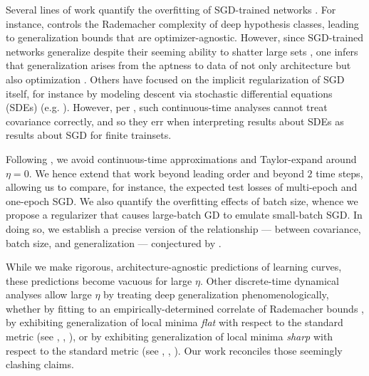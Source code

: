 \documentclass{article}
\theoremstyle{plain}
\theoremstyle{definition}
\begin{document}

    Several lines of work quantify the overfitting of SGD-trained networks
    \citep{ne17a}.  For instance, \citet{ba17} controls the Rademacher
    complexity of deep hypothesis classes, leading to generalization bounds
    that are optimizer-agnostic.  However, since SGD-trained networks
    generalize despite their seeming ability to shatter large sets
    \citep{zh17}, one infers that generalization arises from the aptness to
    data of not only architecture but also optimization \citep{ne17b}.  Others
    have focused on the implicit regularization of SGD itself, for instance by
    modeling descent via stochastic differential equations (SDEs) (e.g.
    \citet{ch18}).  However, per \citet{ya19a}, such continuous-time analyses
    cannot treat covariance correctly, and so they err when interpreting
    results about SDEs as results about SGD for finite trainsets.


    Following \citet{ro18}, we avoid continuous-time approximations and
    Taylor-expand around $\eta=0$.  We hence
    extend that work beyond leading order and beyond $2$ time steps,
    allowing us to compare, for instance, the expected test losses of
    multi-epoch and one-epoch SGD.  We also quantify the overfitting effects of
    batch size, whence we propose a regularizer that causes large-batch
    GD to emulate small-batch SGD.  In doing so, we establish a precise version
    of the relationship --- between covariance, batch size, and generalization
    --- conjectured by \citet{ja18}.  
    

    While we make rigorous, architecture-agnostic predictions of learning
    curves, these predictions become vacuous for large $\eta$.  Other
    discrete-time dynamical analyses allow large $\eta$ by treating deep
    generalization phenomenologically, whether by fitting to an
    empirically-determined correlate of Rademacher bounds \citep{li18}, by
    exhibiting generalization of local minima \emph{flat} with respect to the
    standard metric (see \citet{ho17}, \citet{ke17}, \citet{wa18}), or by
    exhibiting generalization of local minima \emph{sharp} with respect to the
    standard metric (see \citet{st56}, \citet{di17}, \citet{wu18}).  Our work
    reconciles those seemingly clashing claims.
    
\end{document}
